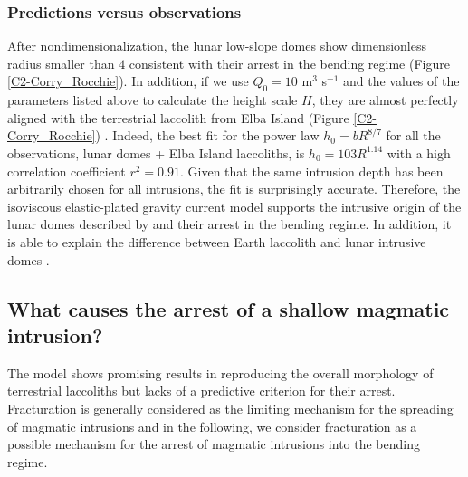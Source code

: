 \subsubsection*{Predictions versus observations}

After   nondimensionalization,   the   lunar  low-slope   domes   show
dimensionless radius smaller than $4$  consistent with their arrest in
the bending regime (Figure \ref{C2-Corry_Rocchie}). In addition, if we
use $Q_0=10$  m$^3$ s$^{-1}$ and  the values of the  parameters listed
above to  calculate the  height scale $H$,  they are  almost perfectly
aligned  with  the  terrestrial  laccolith from  Elba  Island  (Figure
\ref{C2-Corry_Rocchie}) \citep{Michaut:2011kg}.  Indeed,  the best fit
for the power law $h_0=bR^{8/7}$ for all the observations, lunar domes
+  Elba  Island  laccoliths,  is  $h_0  =  103R^{1.14}$  with  a  high
correlation  coefficient $r^2=0.91$.  Given  that  the same  intrusion
depth  has been  arbitrarily chosen  for  all intrusions,  the fit  is
surprisingly  accurate.   Therefore,   the  isoviscous  elastic-plated
gravity current model supports the intrusive origin of the lunar domes
described  by \citet{Wohler:2009jj}  and their  arrest in  the bending
regime.  In  addition, it  is able to  explain the  difference between
Earth laccolith and lunar intrusive domes \citep{Michaut:2011kg}.

\subsection{What causes the arrest of a shallow magmatic intrusion?}
\label{C2-Toughness}
The  model   shows  promising  results  in   reproducing  the  overall
morphology  of  terrestrial  laccoliths  but  lacks  of  a  predictive
criterion for  their arrest.   Fracturation is generally  considered as
the limiting mechanism for the spreading of magmatic intrusions and in
the following,  we consider fracturation  as a possible  mechanism for
the arrest of magmatic intrusions into the bending regime.

